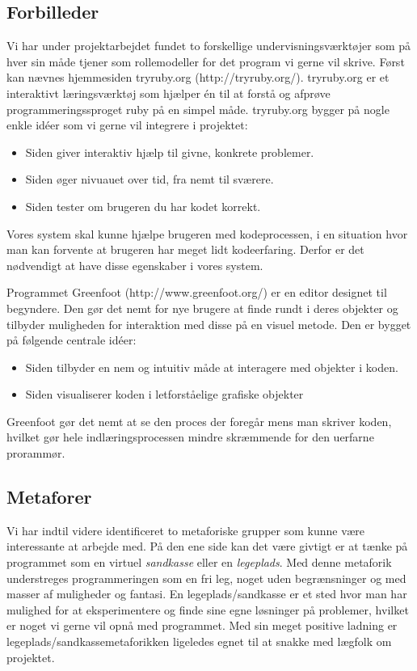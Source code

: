 \documentclass[10pt,a4paper,danish]{article}
\begin{document}
\subsection{Forbilleder}
Vi har under projektarbejdet fundet to forskellige undervisningsværktøjer som på hver sin måde tjener som rollemodeller for det program vi gerne vil skrive. Først kan nævnes hjemmesiden tryruby.org (http://tryruby.org/). tryruby.org er et interaktivt læringsværktøj som hjælper én til at forstå og afprøve  programmeringssproget ruby på en simpel måde. tryruby.org bygger på nogle enkle idéer som vi gerne vil integrere i projektet:
\begin{itemize}
\item Siden giver interaktiv hjælp til givne, konkrete problemer.
\item Siden øger nivuauet over tid, fra nemt til sværere.
\item Siden tester om brugeren du har kodet korrekt.
\end{itemize}
Vores system skal kunne hjælpe brugeren med kodeprocessen, i en situation hvor man kan forvente at brugeren har meget lidt kodeerfaring. Derfor er det nødvendigt at have disse egenskaber i vores system. \\
\newline

Programmet Greenfoot (http://www.greenfoot.org/) er en editor designet til begyndere. Den gør det nemt for nye brugere at finde rundt i deres objekter og tilbyder muligheden for interaktion med disse på en visuel metode. Den er bygget på følgende centrale idéer:
\begin{itemize}
\item Siden tilbyder en nem og intuitiv måde at interagere med objekter i koden. 
\item Siden visualiserer koden i letforståelige grafiske objekter
\end{itemize}
Greenfoot gør det nemt at se den proces der foregår mens man skriver koden, hvilket gør hele indlæringsprocessen mindre skræmmende for den uerfarne prorammør.

\subsection{Metaforer}
Vi har indtil videre identificeret to metaforiske grupper som kunne være interessante at arbejde med. På den ene side kan det være givtigt er at tænke på programmet som en virtuel \emph{sandkasse} eller en \emph{legeplads}. Med denne metaforik understreges programmeringen som en fri leg, noget uden begrænsninger og med masser af muligheder og fantasi. En legeplads/sandkasse er et sted hvor man har mulighed for at eksperimentere og finde sine egne løsninger på problemer, hvilket er noget vi gerne vil opnå med programmet. Med sin meget positive ladning er legeplads/sandkassemetaforikken ligeledes egnet til at snakke med lægfolk om projektet. 
\end{document}
